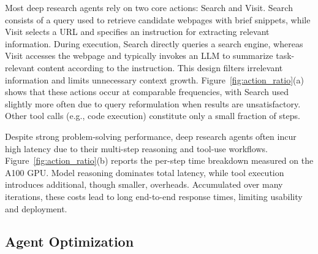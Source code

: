 Most deep research agents rely on two core actions: Search and Visit.
Search consists of a query used to retrieve candidate webpages with brief snippets, while Visit selects a URL and specifies an instruction for extracting relevant information.
During execution,
Search directly queries a search engine, whereas Visit accesses the webpage and typically invokes an LLM to summarize task-relevant content according to the instruction\cite{nakano2021webgpt, zhou2023webarena}.
This design filters irrelevant information and limits unnecessary context growth.
Figure~\ref{fig:action_ratio}(a) shows that these actions occur at comparable frequencies, with Search used slightly more often due to query reformulation when results are unsatisfactory.
Other tool calls (e.g., code execution) constitute only a small fraction of steps.



Despite strong problem-solving performance, deep research agents often incur high latency due to their multi-step reasoning and tool-use workflows.
Figure~\ref{fig:action_ratio}(b) reports the per-step time breakdown measured on the A100 GPU.
Model reasoning dominates total latency, while tool execution introduces additional, though smaller, overheads.
Accumulated over many iterations, these costs lead to long end-to-end response times, limiting usability and deployment.

\subsection{Agent Optimization}


